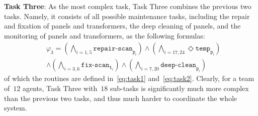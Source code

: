 \textbf{Task Three}: As the most complex task, Task Three combines the previous
two tasks. Namely, it consists of all possible maintenance tasks,
including the repair and fixation of panels and transformers,
the deep cleaning of panels, and the monitoring of panels and transformers,
as the following formulas:
\begin{equation}\label{eq:task3}
  \begin{aligned}
    &\varphi_3 =
    (\bigwedge_{i=1,5} \texttt{repair-scan}_{\texttt{p}_i})
    \wedge (\bigwedge_{i=17,24}\Diamond \texttt{temp}_{\texttt{p}_{i}})\\
     &\wedge
     (\bigwedge_{i=3,6} \texttt{fix-scan}_{\texttt{t}_i})  \wedge
     (\bigwedge_{i=7,20} \texttt{deep-clean}_{\texttt{p}_i})
  \end{aligned}
\end{equation}
of which the routines are defined in~\eqref{eq:task1} and~\eqref{eq:task2}.
Clearly, for a team of~$12$ agents, Task Three with~$18$ sub-tasks is significantly
much more complex
than the previous two tasks, and thus much harder to coordinate the whole system.

